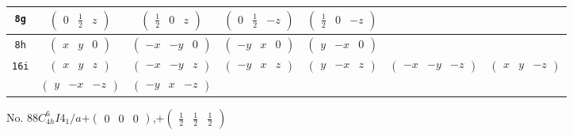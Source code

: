 \documentclass[fleqn,9pt,landscape]{jsarticle}
\begin{document}
\begin{center}
\begin{longtable}{ccccccc}
{\tt 8g} & $ \begin{pmatrix} 0 & \frac{1}{2} & z \end{pmatrix} $ & $ \begin{pmatrix} \frac{1}{2} & 0 & z \end{pmatrix} $ & $ \begin{pmatrix} 0 & \frac{1}{2} & - z \end{pmatrix} $ & $ \begin{pmatrix} \frac{1}{2} & 0 & - z \end{pmatrix} $ & $  $ & $  $ \\ \hline
{\tt 8h} & $ \begin{pmatrix} x & y & 0 \end{pmatrix} $ & $ \begin{pmatrix} - x & - y & 0 \end{pmatrix} $ & $ \begin{pmatrix} - y & x & 0 \end{pmatrix} $ & $ \begin{pmatrix} y & - x & 0 \end{pmatrix} $ & $  $ & $  $ \\ \hline
{\tt 16i} & $ \begin{pmatrix} x & y & z \end{pmatrix} $ & $ \begin{pmatrix} - x & - y & z \end{pmatrix} $ & $ \begin{pmatrix} - y & x & z \end{pmatrix} $ & $ \begin{pmatrix} y & - x & z \end{pmatrix} $ & $ \begin{pmatrix} - x & - y & - z \end{pmatrix} $ & $ \begin{pmatrix} x & y & - z \end{pmatrix} $ \\
& $ \begin{pmatrix} y & - x & - z \end{pmatrix} $ & $ \begin{pmatrix} - y & x & - z \end{pmatrix} $ & $  $ & $  $ & $  $ & $  $ \\
\end{longtable}
\end{center}
\newpage
No. 88\quad$C_{4h}^{6}$\quad$I4_1/a$\quad[ tetragonal ]\quad$+\begin{pmatrix} 0 & 0 & 0 \end{pmatrix}$,\quad $+\begin{pmatrix} \frac{1}{2} & \frac{1}{2} & \frac{1}{2} \end{pmatrix}$
\end{document}
